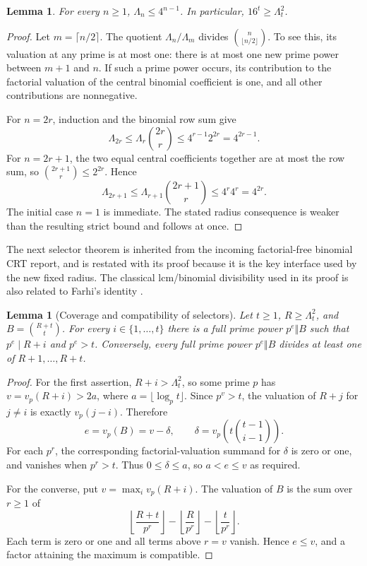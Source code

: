 \documentclass[11pt]{article}
\newtheorem{lemma}[theorem]{Lemma}
\theoremstyle{remark}\newtheorem{remark}[theorem]{Remark}
\begin{document}
\begin{lemma}\label{lem:lcm}
For every $n\ge1$, $\Lambda_n\le4^{n-1}$. In particular,
$16^t\ge\Lambda_t^2$.
\end{lemma}
\begin{proof}
Let $m=\lceil n/2\rceil$. The quotient $\Lambda_n/\Lambda_m$
divides $\binom{n}{\lfloor n/2\rfloor}$. To see this, its valuation
at any prime is at most one: there is at most one new prime power
between $m+1$ and $n$. If such a prime power occurs, its contribution
to the factorial valuation of the central binomial coefficient is one,
and all other contributions are nonnegative.

For $n=2r$, induction and the binomial row sum give
\[
 \Lambda_{2r}\le\Lambda_r\binom{2r}{r}
 \le4^{r-1}2^{2r}=4^{2r-1}.
\]
For $n=2r+1$, the two equal central coefficients together are at most
the row sum, so $\binom{2r+1}{r}\le2^{2r}$. Hence
\[
 \Lambda_{2r+1}\le\Lambda_{r+1}\binom{2r+1}{r}
 \le4^r4^r=4^{2r}.
\]
The initial case $n=1$ is immediate. The stated radius consequence
is weaker than the resulting strict bound and follows at once.
\end{proof}

The next selector theorem is inherited from the incoming factorial-free
binomial CRT report, and is restated with its proof because it is the
key interface used by the new fixed radius. The classical lcm/binomial
divisibility used in its proof is also related to Farhi's identity
\cite{farhi}.

\begin{lemma}[Coverage and compatibility of selectors]\label{lem:selectors}
Let $t\ge1$, $R\ge\Lambda_t^2$, and $B=\binom{R+t}{t}$.
For every $i\in\{1,\ldots,t\}$ there is a full prime power
$p^e\Vert B$ such that $p^e\mid R+i$ and $p^e>t$.
Conversely, every full prime power $p^e\Vert B$ divides at least one
of $R+1,\ldots,R+t$.
\end{lemma}
\begin{proof}
For the first assertion, $R+i>\Lambda_t^2$, so some prime $p$ has
$v=v_p(R+i)>2a$, where $a=\lfloor\log_p t\rfloor$. Since $p^v>t$,
the valuation of $R+j$ for $j\ne i$ is exactly $v_p(j-i)$. Therefore
\[
 e=v_p(B)=v-\delta,\qquad
 \delta=v_p\!\left(t\binom{t-1}{i-1}\right).
\]
For each $p^r$, the corresponding factorial-valuation summand for
$\delta$ is zero or one, and vanishes when $p^r>t$.
Thus $0\le\delta\le a$, so $a<e\le v$ as required.

For the converse, put $v=\max_i v_p(R+i)$. The valuation of $B$ is
the sum over $r\ge1$ of
\[
 \left\lfloor\frac{R+t}{p^r}\right\rfloor
 -\left\lfloor\frac R{p^r}\right\rfloor
 -\left\lfloor\frac t{p^r}\right\rfloor.
\]
Each term is zero or one and all terms above $r=v$ vanish. Hence
$e\le v$, and a factor attaining the maximum is compatible.
\end{proof}
\end{document}
